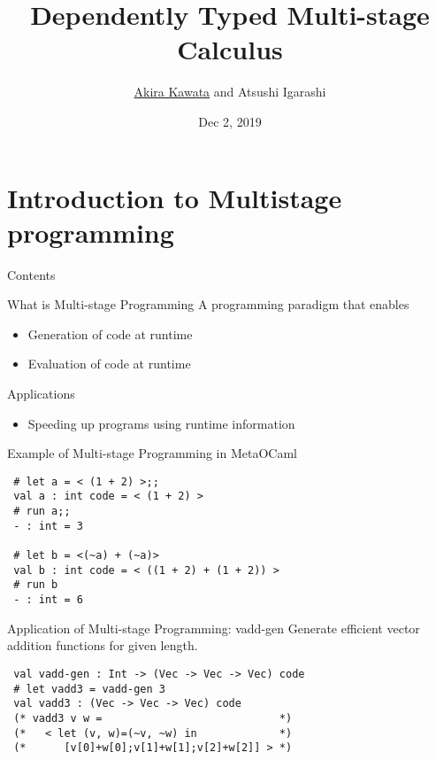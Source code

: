 \documentclass[dvipdfmx,aspectratio=169, 20pt]{beamer}
\title{Dependently Typed Multi-stage Calculus}
\author{\underline{Akira Kawata} and Atsushi Igarashi}
\institute{Graduate School of Informatics, Kyoto University}
\date{Dec 2, 2019}
\begin{document}
\maketitle


\section{Introduction to Multistage programming}

\begin{frame}{Contents}


    \tableofcontents
    \note{
    }
\end{frame}

\begin{frame}[fragile]{What is Multi-stage Programming}
    A programming paradigm that enables
    \begin{itemize}
        \item Generation of code at runtime
        \item Evaluation of code at runtime
    \end{itemize}
    Applications
    \begin{itemize}
        \item Speeding up programs using runtime information
    \end{itemize}
    \note{
    }
\end{frame}

\begin{frame}[fragile]{Example of Multi-stage Programming in MetaOCaml}
    \begin{center}
        \begin{verbatim}
 # let a = < (1 + 2) >;;
 val a : int code = < (1 + 2) >
 # run a;;
 - : int = 3

 # let b = <(~a) + (~a)>
 val b : int code = < ((1 + 2) + (1 + 2)) >
 # run b
 - : int = 6
        \end{verbatim}
    \end{center}
    \note{
    }
\end{frame}

\begin{frame}[fragile]{Application of Multi-stage Programming: vadd-gen}
    Generate efficient vector addition functions for given length.
    
    \begin{verbatim}
 val vadd-gen : Int -> (Vec -> Vec -> Vec) code
 # let vadd3 = vadd-gen 3
 val vadd3 : (Vec -> Vec -> Vec) code
 (* vadd3 v w =                            *)
 (*   < let (v, w)=(~v, ~w) in             *)
 (*      [v[0]+w[0];v[1]+w[1];v[2]+w[2]] > *)
    \end{verbatim}
    \note{
    }
\end{frame}
\end{document}
